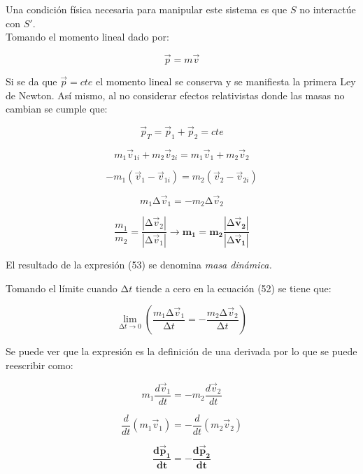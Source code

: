 \documentclass[]{article}
\begin{document}
Una condición física necesaria para manipular este sistema es que \(S\)
no interactúe con \(S'\).\\
Tomando el momento lineal dado por:

\[\overrightarrow{p} = m\overrightarrow{v}\]

Si se da que \(\overrightarrow{p} = cte\) el momento lineal se conserva
y se manifiesta la primera Ley de Newton. Así mismo, al no considerar
efectos relativistas donde las masas no cambian se cumple que:

\[{\overrightarrow{p}}_{T} = {\overrightarrow{p}}_{1} + {\overrightarrow{p}}_{2} = cte\]

\[m_{1}{\overrightarrow{v}}_{1i} + m_{2}{\overrightarrow{v}}_{2i} = m_{1}{\overrightarrow{v}}_{1} + m_{2}{\overrightarrow{v}}_{2}\]

\[{- m}_{1}\left( {\overrightarrow{v}}_{1} - {\overrightarrow{v}}_{1i} \right) = m_{2}\left( {\overrightarrow{v}}_{2} - {\overrightarrow{v}}_{2i} \right)\]

\[m_{1}\mathrm{\Delta}{\overrightarrow{v}}_{1} = - m_{2}\mathrm{\Delta}{\overrightarrow{v}}_{2}\]

\[\frac{m_{1}}{m_{2}} = \frac{\left| \mathrm{\Delta}{\overrightarrow{v}}_{2} \right|}{\left| \mathrm{\Delta}{\overrightarrow{v}}_{1} \right|} \rightarrow \mathbf{m}_{\mathbf{1}}\mathbf{=}\mathbf{m}_{\mathbf{2}}\frac{\left| \mathbf{\mathrm{\Delta}}{\overrightarrow{\mathbf{v}}}_{\mathbf{2}} \right|}{\left| \mathbf{\mathrm{\Delta}}{\overrightarrow{\mathbf{v}}}_{\mathbf{1}} \right|}\]

El resultado de la expresión (53) se denomina \emph{masa dinámica.}

Tomando el límite cuando \(\mathrm{\Delta}t\) tiende a cero en la
ecuación (52) se tiene que:

\[\lim_{\mathrm{\Delta}t \rightarrow 0}\left( \frac{m_{1}\mathrm{\Delta}{\overrightarrow{v}}_{1}}{\mathrm{\Delta}t} = - \frac{m_{2}\mathrm{\Delta}{\overrightarrow{v}}_{2}}{\mathrm{\Delta}t} \right)\]

Se puede ver que la expresión es la definición de una derivada por lo
que se puede reescribir como:

\[m_{1}\frac{d{\overrightarrow{v}}_{1}}{dt} = - m_{2}\frac{d{\overrightarrow{v}}_{2}}{dt}\]

\[\frac{d}{dt}\left( m_{1}{\overrightarrow{v}}_{1} \right) = - \frac{d}{dt}\left( m_{2}{\overrightarrow{v}}_{2} \right)\]

\[\frac{\mathbf{d}{\overrightarrow{\mathbf{p}}}_{\mathbf{1}}}{\mathbf{dt}}\mathbf{= -}\frac{\mathbf{d}{\overrightarrow{\mathbf{p}}}_{\mathbf{2}}}{\mathbf{dt}}\]
\end{document}
